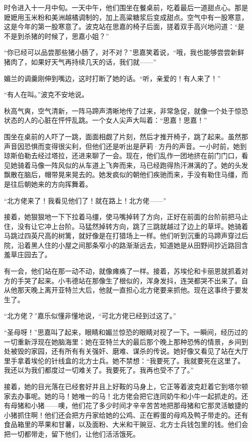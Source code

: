 \par 时令进入十一月中旬。一天中午，他们围坐在餐桌前，吃着最后一道甜点心。那是嬷嬷用玉米粉和美洲越橘调制的，加上高粱糖浆后变成甜点。空气中有一股寒意，这是今年的第一股寒意了。波克站在思嘉的椅子后面，搓着双手高兴地问道：“是不是到杀猪的时候了，思嘉小姐？”
\par “你已经可以品尝那些猪小肠了，对不对？”思嘉笑着说，“哦，我也能够尝尝新鲜猪肉了，如果好天气再持续几天的话，我们就——”
\par 媚兰的调羹刚伸到嘴边，这时打断了她的话。“听，亲爱的！有人来了！”
\par “有人在叫。”波克不安地说。
\par 秋高气爽，空气清新，一阵马蹄声清晰地传了过来，非常急促，就像一个处于惊恐状态的人的心脏在怦怦乱跳。一个女人尖声大叫着：“思嘉！思嘉！”
\par 围坐在桌前的人吓了一跳，面面相觑了片刻，然后才推开椅子，跳了起来。虽然那声音因恐惧而变得很尖利，但他们还是听出是萨莉·方丹的声音。一小时前，她到琼斯伯勒去经过塔拉，还进来聊了一会。现在，他们乱作一团地挤在前门门口，看见她骑着马像一阵风似的从车道上飞奔而来，马已经跑得热汗淋漓的了。她的头发飘散在脑后，帽带晃来晃去的。她发疯似的朝他们疾驰而来，手没有勒住马缰，而是往后朝她来的方向挥舞着。
\par “北方佬来了！我看见他们了！就在路上！北方佬——”
\par 接着，她狠狠地一下下拉着马缰，使马嘴掉转了方向，正好在前面的台阶前把马止住，没有让它冲上台阶。马猛然掉转方向，跳了三跳就越过了边上的草坪。她骑着马跳过四英尺高的树篱，就好像是在打猎场上一样。他们听到沉重的马蹄声穿过后院，沿着黑人住的小屋之间那条窄小的路渐渐远去，知道她是从田野间抄近路回含羞草庄园去了。
\par 有一会，他们站在那一动不动，就像瘫痪了一样。接着，苏埃伦和卡丽恩就抓着对方的手哭了起来。小韦德站在那像生了根似的，浑身发抖，连哭都哭不出来了。自从他那天晚上离开亚特兰大后，他就一直担心北方佬要来抓他。现在这事终于要发生了。
\par “北方佬？”嘉乐似懂非懂地说，“可北方佬已经到过这了。”
\par “圣母呀！”思嘉叫了起来，眼睛和媚兰惊恐的眼睛对视了一下。一瞬间，经历过的一切重新浮现在她脑海里：她在亚特兰大的最后那个晚上那种恐怖的情景，乡间到处被毁的家园，还有所有有关强奸、磨难、谋杀的传说。她好像又看见了站在大厅里手拿着埃伦的针线盒的北方士兵。她不禁想：“我要死了。我就要死在这里了。我还以为我们都度过一切难关了。我要死了。我再也受不了了。”
\par 接着，她的目光落在已经套好并且上好鞍的马身上，它正等着波克赶着它到塔尔顿家去办事呢。她的马！她唯一的马！北方佬会把它连同奶牛和小牛一起抓走的。还有母猪和小猪——噢，他们花了多少时间才辛辛苦苦地把那母猪和它那灵活敏捷的小猪抓住啊！他们还会把方丹家给她的公鸡、正在孵蛋的母鸡及鸭子带走的。还有食品箱里的苹果和甘薯，以及面粉、大米和干豌豆、北方士兵钱包里的钱。他们会把一切都带走，留下他们，让他们活活饿死。
